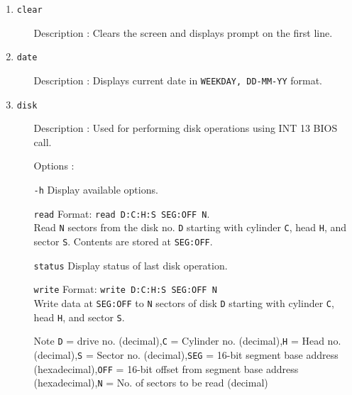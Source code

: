 \begin{enumerate}
  \item \texttt{clear}
  		\begin{enumerate}[align=parleft, labelsep=2cm, leftmargin=1.06in]
  		  \item[Description]: Clears the screen and displays prompt on the first line.
  		\end{enumerate}
  \item \texttt{date}
  		\begin{enumerate}[align=parleft, labelsep=2cm, leftmargin=1.06in]
  		  \item[Description]: Displays current date in \texttt{WEEKDAY, DD-MM-YY} format.
  		\end{enumerate}
  \item \texttt{disk}
  		\begin{enumerate}[align=parleft, labelsep=2cm, leftmargin=1.06in]
  		  \item[Description]: Used for performing disk operations using INT 13 BIOS call.
  		  \item[Options]:
  		  \item[\texttt{-h}] Display available options.
  		  \item[\texttt{read}] Format: \texttt{read D:C:H:S SEG:OFF N}.\\Read \texttt{N} sectors from the disk no. \texttt{D} starting with cylinder \texttt{C}, head \texttt{H}, and sector \texttt{S}. Contents are stored at \texttt{SEG:OFF}.
  		  \item[\texttt{status}] Display status of last disk operation.
  		  \item[\texttt{write}] Format: \texttt{write D:C:H:S SEG:OFF N}\\Write data at \texttt{SEG:OFF} to \texttt{N} sectors of disk \texttt{D} starting with cylinder \texttt{C}, head \texttt{H}, and sector \texttt{S}.
  		  \item[Note] \texttt{D} = drive no. (decimal),\newline\texttt{C} = Cylinder no. (decimal),\newline\texttt{H} = Head no. (decimal),\newline\texttt{S} = Sector no. (decimal),\newline\texttt{SEG} = 16-bit segment base address (hexadecimal),\newline\texttt{OFF} = 16-bit offset from segment base address (hexadecimal),\newline\texttt{N} = No. of sectors to be read (decimal)    

\end{enumerate}
\end{enumerate}
